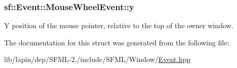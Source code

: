 \hypertarget{structsf_1_1_event_1_1_mouse_wheel_event_a7ea1b8d8c28e2f530c6e9e6d9a5d32d3}{
\subsubsection[{y}]{ sf\-::\-Event\-::\-Mouse\-Wheel\-Event\-::y}}\label{structsf_1_1_event_1_1_mouse_wheel_event_a7ea1b8d8c28e2f530c6e9e6d9a5d32d3}


Y position of the mouse pointer, relative to the top of the owner window. 



The documentation for this struct was generated from the following file\-:\begin{DoxyCompactItemize}
\item 
lib/lapin/dep/\-S\-F\-M\-L-\/2./include/\-S\-F\-M\-L/\-Window/\hyperlink{lib_2lapin_2dep_2_s_f_m_l-2_83_2include_2_s_f_m_l_2_window_2_event_8hpp}{Event.\-hpp}\end{DoxyCompactItemize}
